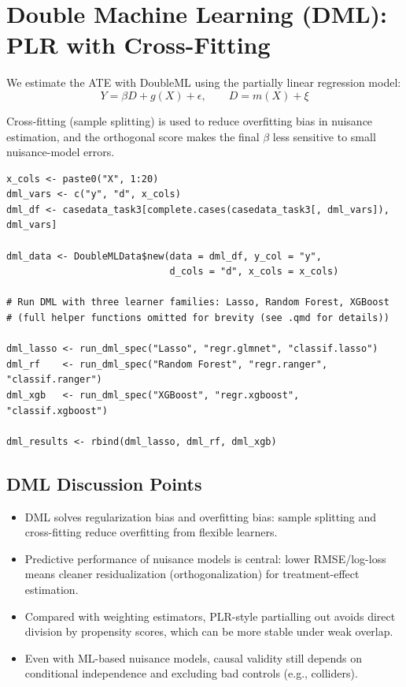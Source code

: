 \documentclass[12pt,a4paper]{article}
\begin{document}
\section{Double Machine Learning (DML): PLR with Cross-Fitting}

We estimate the ATE with DoubleML using the partially linear regression model:
\[
Y = \beta D + g(X) + \epsilon, \qquad D = m(X) + \xi
\]

Cross-fitting (sample splitting) is used to reduce overfitting bias in nuisance estimation, and the orthogonal score makes the final $\beta$ less sensitive to small nuisance-model errors.

\begin{lstlisting}
x_cols <- paste0("X", 1:20)
dml_vars <- c("y", "d", x_cols)
dml_df <- casedata_task3[complete.cases(casedata_task3[, dml_vars]), dml_vars]

dml_data <- DoubleMLData$new(data = dml_df, y_col = "y",
                             d_cols = "d", x_cols = x_cols)

# Run DML with three learner families: Lasso, Random Forest, XGBoost
# (full helper functions omitted for brevity (see .qmd for details))

dml_lasso <- run_dml_spec("Lasso", "regr.glmnet", "classif.lasso")
dml_rf    <- run_dml_spec("Random Forest", "regr.ranger", "classif.ranger")
dml_xgb   <- run_dml_spec("XGBoost", "regr.xgboost", "classif.xgboost")

dml_results <- rbind(dml_lasso, dml_rf, dml_xgb)
\end{lstlisting}

\subsection{DML Discussion Points}
\begin{itemize}
\item DML solves regularization bias and overfitting bias: sample splitting and cross-fitting reduce overfitting from flexible learners.
\item Predictive performance of nuisance models is central: lower RMSE/log-loss means cleaner residualization (orthogonalization) for treatment-effect estimation.
\item Compared with weighting estimators, PLR-style partialling out avoids direct division by propensity scores, which can be more stable under weak overlap.
\item Even with ML-based nuisance models, causal validity still depends on conditional independence and excluding bad controls (e.g., colliders).
\end{itemize}
\end{document}
